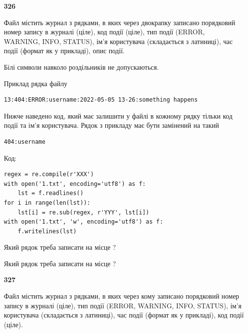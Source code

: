 \newpage

{\begin {center}\textbf{ 326}\end {center}}\par
Файл  містить журнал з рядками, в яких через двокрапку записано поряд\-ко\-вий номер запису в журналі (ціле), код події (ціле), тип події (ERROR, \\WARNING, INFO, STATUS), ім'я користувача (складається з латиниці), час події (фор\-мат як у прикладі), опис події.

Білі символи навколо роздільників не допускаються.

Приклад рядка файлу



\begin{verbatim}
13:404:ERROR:username:2022-05-05 13-26:something happens
\end{verbatim}


Нижче наведено код, який має залишити у файлі в кожному рядку тільки код події та ім'я користувача. Рядок з прикладу має бути замінений на такий



\begin{verbatim}
404:username
\end{verbatim}




Код:



\begin{verbatim}
regex = re.compile(r'XXX')
with open('1.txt', encoding='utf8') as f:
    lst = f.readlines()
for i in range(len(lst)):
    lst[i] = re.sub(regex, r'YYY', lst[i])
with open('1.txt', 'w', encoding='utf8') as f:
    f.writelines(lst)
\end{verbatim}







Який рядок треба записати на місце  ?\par
\vspace{5mm}


Який рядок треба записати на місце  ?\par


\newpage

{\begin {center}\textbf{ 327}\end {center}}\par
Файл  містить журнал з рядками, в яких через кому записано поряд\-ко\-вий номер запису в журналі (ціле), тип події (ERROR, WARNING, INFO, STATUS), ім'я користувача (складається з латиниці), час події (фор\-мат як у прикладі), код події (ціле).


